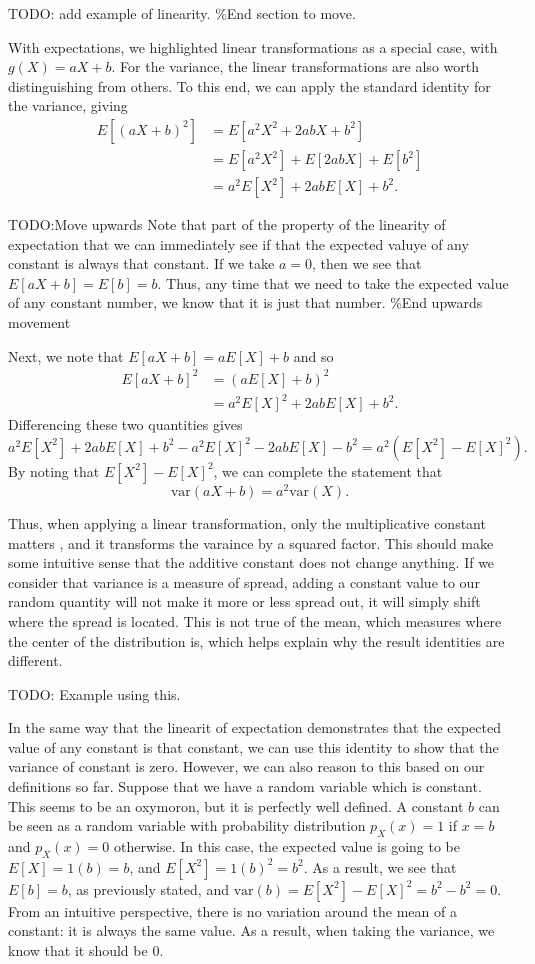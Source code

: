 \documentclass[
  letterpaper,
  DIV=11,
  numbers=noendperiod]{scrreprt}
\begin{document}
TODO: add example of linearity. \%End section to move.

With expectations, we highlighted linear transformations as a special
case, with \(g(X) = aX + b\). For the variance, the linear
transformations are also worth distinguishing from others. To this end,
we can apply the standard identity for the variance, giving
\begin{align*}
E[(aX+b)^2] &= E[a^2X^2 + 2abX + b^2] \\
&= E[a^2X^2] + E[2abX] + E[b^2]\\
&= a^2E[X^2] + 2abE[X] + b^2.
\end{align*}

TODO:Move upwards Note that part of the property of the linearity of
expectation that we can immediately see if that the expected valuye of
any constant is always that constant. If we take \(a = 0\), then we see
that \(E[aX + b] = E[b] = b\). Thus, any time that we need to take the
expected value of any constant number, we know that it is just that
number. \%End upwards movement

Next, we note that \(E[aX + b] = aE[X] + b\) and so \begin{align*}
E[aX + b]^2 &= (aE[X] + b)^2 \\
&= a^2E[X]^2 + 2abE[X] + b^2.\end{align*} Differencing these two
quantities gives
\[a^2E[X^2] + 2abE[X] + b^2 - a^2E[X]^2 - 2abE[X] - b^2 = a^2(E[X^2] - E[X]^2).\]
By noting that \(E[X^2] - E[X]^2\), we can complete the statement that
\[\text{var}(aX + b) = a^2\text{var}(X).\]

Thus, when applying a linear transformation, only the multiplicative
constant matters , and it transforms the varaince by a squared factor.
This should make some intuitive sense that the additive constant does
not change anything. If we consider that variance is a measure of
spread, adding a constant value to our random quantity will not make it
more or less spread out, it will simply shift where the spread is
located. This is not true of the mean, which measures where the center
of the distribution is, which helps explain why the result identities
are different.

TODO: Example using this.

In the same way that the linearit of expectation demonstrates that the
expected value of any constant is that constant, we can use this
identity to show that the variance of constant is zero. However, we can
also reason to this based on our definitions so far. Suppose that we
have a random variable which is constant. This seems to be an oxymoron,
but it is perfectly well defined. A constant \(b\) can be seen as a
random variable with probability distribution \(p_X(x) = 1\) if \(x=b\)
and \(p_X(x) = 0\) otherwise. In this case, the expected value is going
to be \(E[X] = 1(b) = b\), and \(E[X^2] = 1(b)^2 = b^2\). As a result,
we see that \(E[b] = b\), as previously stated, and
\(\text{var}(b) = E[X^2] - E[X]^2 = b^2 - b^2 = 0\). From an intuitive
perspective, there is no variation around the mean of a constant: it is
always the same value. As a result, when taking the variance, we know
that it should be \(0\).
\end{document}
